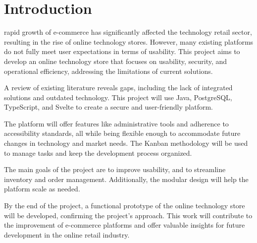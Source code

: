 \documentclass[twoside,a4paper,journal]{IEEEtran}
\begin{document}
\section{Introduction}
%
%
%
%
rapid growth of e-commerce has significantly affected the technology retail
sector, resulting in the rise of online technology stores.
However, many existing platforms do not fully meet user expectations in terms of
usability.
This project aims to develop an online technology store that focuses on
usability, security, and operational efficiency, addressing the limitations of
current solutions.

A review of
existing literature reveals gaps, including the lack of integrated solutions and
outdated technology.
This project will use Java, PostgreSQL, TypeScript, and Svelte
to create a secure and user-friendly platform.

The platform will offer features like
administrative tools and adherence to accessibility standards, all while being
flexible enough to accommodate future changes in technology and market needs.
The Kanban methodology will be used to manage tasks and keep the development
process organized.

The main goals of the project are to improve usability, and
to streamline inventory and order management.
Additionally, the modular design will help the platform scale as needed.

By the end of the project, a functional prototype of the online technology store
will be developed, confirming the project's approach. This work will contribute
to the improvement of e-commerce platforms and offer valuable insights for
future development in the online retail industry.

\end{document}
